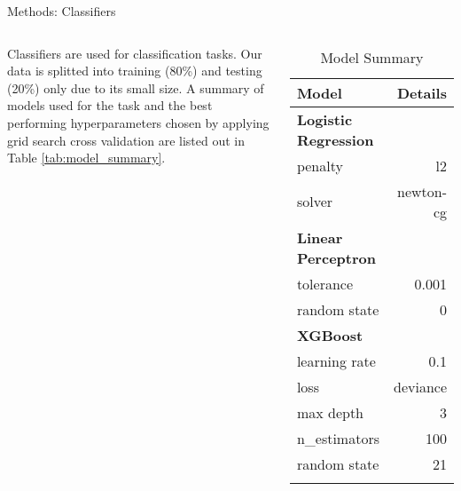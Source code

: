 \begin{frame}{Methods: Classifiers}
\begin{columns}
Classifiers are used for classification tasks. Our data is splitted into training (80\%) and testing (20\%) only due to its small size. A summary of models used for the task and the best performing hyperparameters chosen by applying grid search cross validation are listed out in Table \autoref{tab:model_summary}.
\begin{table}
	\caption{Model Summary}
	\centering
	\begin{tabular}{lr}
		\toprule
		\textbf{Model} & \textbf{Details} \\
		\toprule
		\textbf{Logistic Regression} & \\ 
		penalty & l2 \\
		solver & newton-cg \\
		\midrule
		\textbf{Linear Perceptron} & \\
		tolerance & 0.001 \\
		random state & 0 \\
		\midrule
		\textbf{XGBoost} & \\
		learning rate & 0.1\\
		loss & deviance \\
		max depth & 3 \\
		n\_estimators & 100 \\
		random state & 21 \\
	\bottomrule
	\label{tab:model_summary}
	\end{tabular}
\end{table}
\end{columns}
\end{frame}

